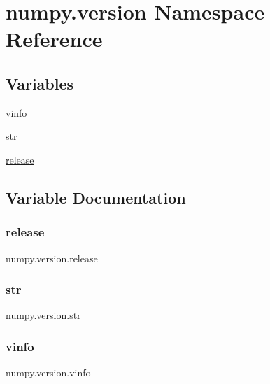 \hypertarget{namespacenumpy_1_1version}{}\section{numpy.\+version Namespace Reference}
\label{namespacenumpy_1_1version}
\subsection*{Variables}
\begin{DoxyCompactItemize}
\item 
\hyperlink{namespacenumpy_1_1version_a44603d26fdf7777764e9ac6e66ce7727}{vinfo}
\item 
\hyperlink{namespacenumpy_1_1version_ac7d54987ae03f24542ff78edb28c247f}{str}
\item 
\hyperlink{namespacenumpy_1_1version_a4954648867cf828f182a497829a032fc}{release}
\end{DoxyCompactItemize}


\subsection{Variable Documentation}
\mbox{\label{namespacenumpy_1_1version_a4954648867cf828f182a497829a032fc}} 
\subsubsection{\texorpdfstring{release}{release}}
{\footnotesize\ttfamily numpy.\+version.\+release}

\mbox{\label{namespacenumpy_1_1version_ac7d54987ae03f24542ff78edb28c247f}} 
\subsubsection{\texorpdfstring{str}{str}}
{\footnotesize\ttfamily numpy.\+version.\+str}

\mbox{\label{namespacenumpy_1_1version_a44603d26fdf7777764e9ac6e66ce7727}} 
\subsubsection{\texorpdfstring{vinfo}{vinfo}}
{\footnotesize\ttfamily numpy.\+version.\+vinfo}

